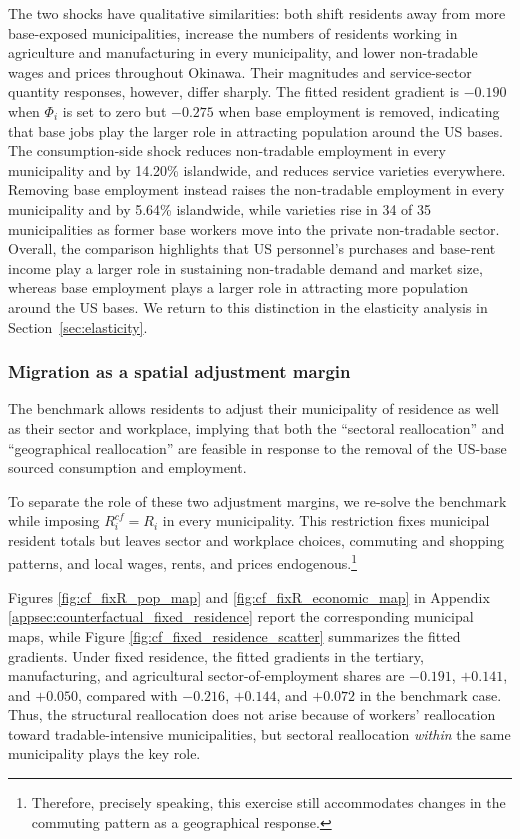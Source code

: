 \documentclass[12pt, unicode, a4paper]{article}
\newcommand{\1}{\mbox{1}\hspace{-0.25em}\mbox{l}} %
\begin{document}
The two shocks have qualitative similarities: both shift residents away from more base-exposed municipalities, increase the numbers of residents working in agriculture and manufacturing in every municipality, and lower non-tradable wages and prices throughout Okinawa. Their magnitudes and service-sector quantity responses, however, differ sharply. The fitted resident gradient is $-0.190$ when $\Phi_i$ is set to zero but $-0.275$ when base employment is removed, indicating that base jobs play the larger role in attracting population around the US bases. The consumption-side shock reduces non-tradable employment in every municipality and by 14.20\% islandwide, and reduces service varieties everywhere. Removing base employment instead raises the non-tradable employment in every municipality and by 5.64\% islandwide, while varieties rise in 34 of 35 municipalities as former base workers move into the private non-tradable sector.
Overall, the comparison highlights that US personnel's purchases and base-rent income play a larger role in sustaining non-tradable demand and market size, whereas base employment plays a larger role in attracting more population around the US bases. We return to this distinction  in the elasticity analysis in Section~\ref{sec:elasticity}.

\subsubsection{Migration as a spatial adjustment margin}\label{sec:counterfactual_migration}

The benchmark allows residents to adjust their municipality of residence as well as their sector and workplace, implying that both the ``sectoral reallocation'' and ``geographical reallocation'' are feasible in response to the removal of the US-base sourced consumption and employment.

To separate the role of these two adjustment margins, we re-solve the benchmark while imposing $R_i^{cf}=R_i$ in every municipality.
This restriction fixes municipal resident totals but leaves sector and workplace choices, commuting and shopping patterns, and local wages, rents, and prices endogenous.\footnote{Therefore, precisely speaking, this exercise still accommodates changes in the commuting pattern as a geographical response.}

Figures \ref{fig:cf_fixR_pop_map} and \ref{fig:cf_fixR_economic_map} in Appendix \ref{appsec:counterfactual_fixed_residence} report the corresponding municipal maps, while Figure \ref{fig:cf_fixed_residence_scatter} summarizes the fitted gradients.
Under fixed residence, the fitted gradients in the tertiary, manufacturing, and agricultural sector-of-employment shares are $-0.191$, $+0.141$, and $+0.050$, compared with $-0.216$, $+0.144$, and $+0.072$ in the benchmark case. Thus, the structural reallocation does not arise because of workers' reallocation toward tradable-intensive municipalities, but sectoral reallocation \textit{within} the same municipality plays the key role.
\end{document}
